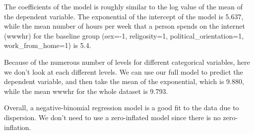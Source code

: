 \documentclass[
  letterpaper,
  DIV=11,
  numbers=noendperiod]{scrartcl}
\begin{document}
The coefficients of the model is roughly similar to the log value of the
mean of the dependent variable. The exponential of the intercept of the
model is 5.637, while the mean number of hours per week that a person
spends on the internet (wwwhr) for the baseline group (sex=-1,
religosity=1, political\_orientation=1, work\_from\_home=1) is 5.4.

Because of the numerous number of levels for different categorical
variables, here we don't look at each different levels. We can use our
full model to predict the dependent variable, and then take the mean of
the exponential, which is 9.880, while the mean wwwhr for the whole
dataset is 9.793.

Overall, a negative-binomial regression model is a good fit to the data
due to dispersion. We don't need to use a zero-inflated model since
there is no zero-inflation.
\end{document}
